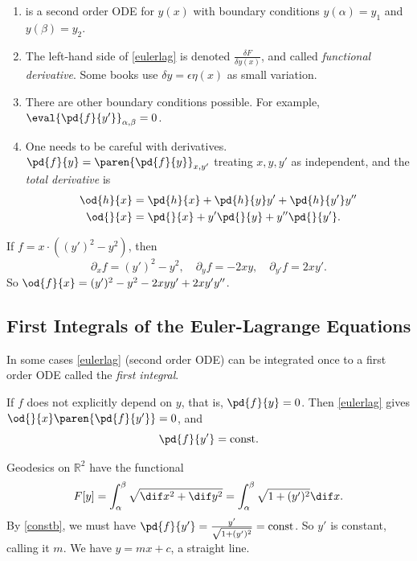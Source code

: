 \begin{remark}
    \begin{enumerate}
        \item {} is a second order ODE for \(y(x)\) with boundary conditions \(y(\alpha) = y_1\) and \(y(\beta) = y_2\).
        \item The left-hand side of \cref{eulerlag} is denoted \(\frac{\delta F}{\delta y(x)}\), and called \textit{functional derivative}. Some books use \(\delta y = \epsilon \eta(x)\) as small variation.
        \item There are other boundary conditions possible. For example, \(\eval{\pd{f}{y'}}_{\alpha, \beta} = 0\).
        \item One needs to be careful with derivatives. \(\pd{f}{y} = \paren{\pd{f}{y}}_{x, y'}\) treating \(x, y, y'\) as independent, and the \textit{total derivative} is
        \begin{align*}
            \od{h}{x} &= \pd{h}{x} + \pd{h}{y}y' + \pd{h}{y'}y''\\
            \od{}{x} &= \pd{}{x} + y'\pd{}{y} + y'' \pd{}{y'}.
        \end{align*}
    \end{enumerate}
\end{remark}
\begin{example}
    If \(f = x\cdot ((y')^2 - y^2)\), then
    \[
        \partial_x f = (y')^2 - y^2,\quad \partial_y f = - 2xy, \quad \partial_{y'} f =2xy'.
    \]
    So \(\od{f}{x} = (y')^2 - y^2 - 2xyy' + 2xy'y''\).
\end{example}
\subsection{First Integrals of the Euler-Lagrange Equations}
In some cases \cref{eulerlag} (second order ODE) can be integrated once to a first order ODE called the \textit{first integral}.

If \(f\) does not explicitly depend on \(y\), that is, \(\pd{f}{y} = 0\). Then \cref{eulerlag} gives \(\od{}{x}\paren{\pd{f}{y'}} = 0\), and
\begin{equation}
    \pd{f}{y'} = \text{const}.
    \label{constb}
\end{equation}
\begin{example}
    Geodesics on \(\mathbb{R}^2\) have the functional
    \[
        F[y] = \int^\beta_\alpha \sqrt{\dif x^2 + \dif y^2} = \int_\alpha^\beta \sqrt{1 + (y')^2} \dif x.
    \]
    By \cref{constb}, we must have \(\pd{f}{y'} = \frac{y'}{\sqrt{1 + (y')^2}} = \text{const}\). So \(y'\) is constant, calling it \(m\). We have \(y = mx + c\), a straight line.
\end{example}